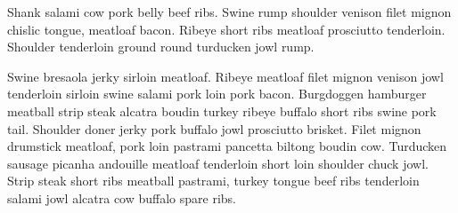 \documentclass[conference]{IEEEtran}
\begin{document}
	Shank salami cow pork belly beef ribs. Swine rump shoulder venison filet mignon chislic tongue, meatloaf bacon. Ribeye short ribs meatloaf prosciutto tenderloin. Shoulder tenderloin ground round turducken jowl rump.
	
	Swine bresaola jerky sirloin meatloaf. Ribeye meatloaf filet mignon venison jowl tenderloin sirloin swine salami pork loin pork bacon. Burgdoggen hamburger meatball strip steak alcatra boudin turkey ribeye buffalo short ribs swine pork tail. Shoulder doner jerky pork buffalo jowl prosciutto brisket. Filet mignon drumstick meatloaf, pork loin pastrami pancetta biltong boudin cow. Turducken sausage picanha andouille meatloaf tenderloin short loin shoulder chuck jowl. Strip steak short ribs meatball pastrami, turkey tongue beef ribs tenderloin salami jowl alcatra cow buffalo spare ribs.
	
	
\end{document}
